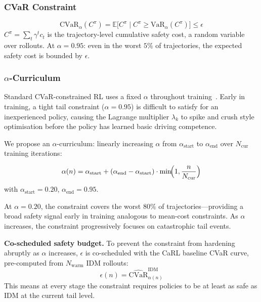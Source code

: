 \documentclass[conference]{IEEEtran}
\begin{document}
\subsubsection{CVaR Constraint}

\begin{equation}
\text{CVaR}_{\alpha}(C^{\pi})=
  \mathbb{E}\bigl[C^{\pi}\mid C^{\pi}\geq\text{VaR}_{\alpha}(C^{\pi})\bigr]
  \leq\epsilon
\label{eq:cvar}
\end{equation}
$C^{\pi}=\sum_{t}\gamma^{t}c_{t}$ is the trajectory-level cumulative
safety cost, a random variable over rollouts. At $\alpha\!=\!0.95$:
even in the worst $5\%$ of trajectories, the expected safety cost is
bounded by $\epsilon$.

\subsubsection{$\alpha$-Curriculum}

Standard CVaR-constrained RL uses a fixed $\alpha$ throughout
training~\cite{CVaRCPO2024,TRC2022,CPPO2022}. Early in training, a
tight tail constraint ($\alpha\!=\!0.95$) is difficult to satisfy for
an inexperienced policy, causing the Lagrange multiplier $\lambda_{k}$
to spike and crush style optimisation before the policy has learned
basic driving competence.

We propose an $\alpha$-curriculum: linearly increasing $\alpha$ from
$\alpha_{\text{start}}$ to $\alpha_{\text{end}}$ over
$N_{\text{cur}}$ training iterations:

\begin{equation}
\alpha(n)=\alpha_{\text{start}}+(\alpha_{\text{end}}-\alpha_{\text{start}})
  \cdot\min\!\Bigl(1,\frac{n}{N_{\text{cur}}}\Bigr)
\label{eq:curriculum}
\end{equation}
with $\alpha_{\text{start}}\!=\!0.20$, $\alpha_{\text{end}}\!=\!0.95$.

At $\alpha\!=\!0.20$, the constraint covers the worst $80\%$ of
trajectories---providing a broad safety signal early in training
analogous to mean-cost constraints. As $\alpha$ increases, the constraint
progressively focuses on catastrophic tail events.

\textbf{Co-scheduled safety budget.}
To prevent the constraint from hardening abruptly as $\alpha$ increases,
$\epsilon$ is co-scheduled with the CaRL baseline CVaR curve, pre-computed
from $N_{\text{warm}}$ IDM rollouts:
\begin{equation}
\epsilon(n)=\widehat{\text{CVaR}}_{\alpha(n)}^{\text{IDM}}
\label{eq:epsilon}
\end{equation}
This means at every stage the constraint requires policies to be at
least as safe as IDM at the current tail level.
\end{document}
